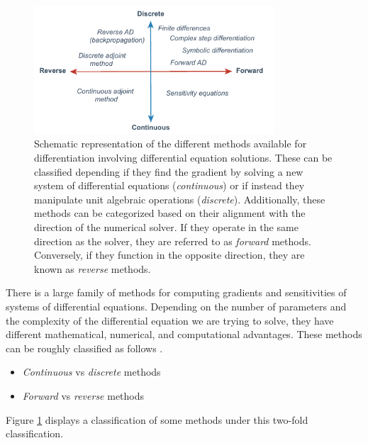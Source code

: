 \begin{figure}[t]
    \centering
    \includegraphics[width=0.80\textwidth]{figures/scheme-methods.pdf}
    \caption{Schematic representation of the different methods available for differentiation involving differential equation solutions. These can be classified depending if they find the gradient by solving a new system of differential equations (\textit{continuous}) or if instead they manipulate unit algebraic operations (\textit{discrete}). Additionally, these methods can be categorized based on their alignment with the direction of the numerical solver. If they operate in the same direction as the solver, they are referred to as \textit{forward} methods. Conversely, if they function in the opposite direction, they are known as \textit{reverse} methods.}
    \label{fig:scheme-all-methods}
\end{figure}

There is a large family of methods for computing gradients and sensitivities of systems of differential equations. 
Depending on the number of parameters and the complexity of the differential equation we are trying to solve, they have different mathematical, numerical, and computational advantages.
These methods can be roughly classified as  follows \cite{ma2021comparison}. 
\begin{itemize}
    \item \textit{Continuous} vs \textit{discrete}  methods
    \item \textit{Forward} vs \textit{reverse} methods
\end{itemize}
Figure \ref{fig:scheme-all-methods} displays a classification of some methods under this two-fold classification. 

